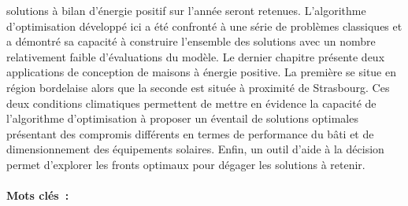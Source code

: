 solutions à bilan d’énergie positif sur l’année seront retenues. L’algorithme
d’optimisation développé ici a été confronté à une série de problèmes classiques et a
démontré sa capacité à construire l’ensemble des solutions avec un nombre relativement
faible d’évaluations du modèle.
Le dernier chapitre présente deux applications de conception de maisons à énergie
positive. La première se situe en région bordelaise alors que la seconde est située à
proximité de Strasbourg. Ces deux conditions climatiques permettent de mettre en évidence
la capacité de l’algorithme d’optimisation à proposer un éventail de solutions optimales
présentant des compromis différents en termes de performance du bâti et de dimensionnement
des équipements solaires. Enfin, un outil d’aide à la décision permet d’explorer les
fronts optimaux pour dégager les solutions à retenir. \\ \\
\noindent\textbf{Mots clés~: } \keywordsFR

\vfill

